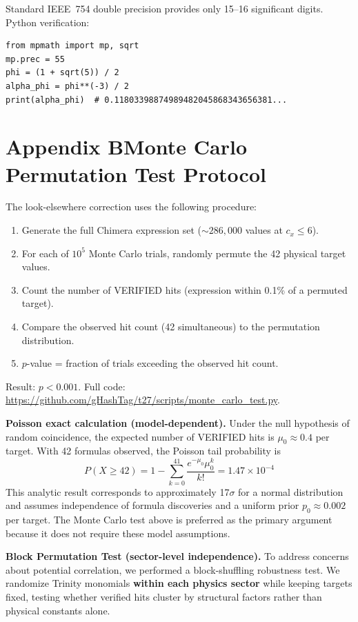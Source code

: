 \documentclass[10pt,a4paper]{article}
\begin{document}
Standard IEEE~754 double precision provides only 15--16 significant digits.
Python verification:
\begin{verbatim}
from mpmath import mp, sqrt
mp.prec = 55
phi = (1 + sqrt(5)) / 2
alpha_phi = phi**(-3) / 2
print(alpha_phi)  # 0.11803398874989482045868343656381...
\end{verbatim}

\section*{Appendix B\quad Monte Carlo Permutation Test Protocol}

The look-elsewhere correction uses the following procedure:
\begin{enumerate}
  \item Generate the full Chimera expression set ($\sim 286,000$ values at $c_x \le 6$).
  \item For each of $10^5$ Monte Carlo trials, randomly permute the 42 physical target values.
  \item Count the number of VERIFIED hits (expression within 0.1\% of a permuted target).
  \item Compare the observed hit count (42 simultaneous) to the permutation distribution.
  \item $p$-value = fraction of trials exceeding the observed hit count.
\end{enumerate}
Result: $p < 0.001$. Full code: \url{https://github.com/gHashTag/t27/scripts/monte_carlo_test.py}.

\medskip
\noindent\textbf{Poisson exact calculation (model-dependent).}
Under the null hypothesis of random coincidence, the expected number of VERIFIED hits is
$\mu_0 \approx 0.4$ per target. With 42 formulas observed, the Poisson tail probability is
\begin{equation}
  P(X \geq 42) = 1 - \sum_{k=0}^{41} \frac{e^{-\mu_0} \mu_0^k}{k!} = 1.47 \times 10^{-4}
\end{equation}
This analytic result corresponds to approximately 17$\sigma$ for a normal distribution and
assumes independence of formula discoveries and a uniform prior $p_0 \approx 0.002$ per target.
The Monte Carlo test above is preferred as the primary argument because it does not require
these model assumptions.

\medskip
\noindent\textbf{Block Permutation Test (sector-level independence).}
To address concerns about potential correlation, we performed a block-shuffling
robustness test. We randomize Trinity monomials \textbf{within each physics sector}
while keeping targets fixed, testing whether verified hits cluster by structural
factors rather than physical constants alone.
\end{document}
